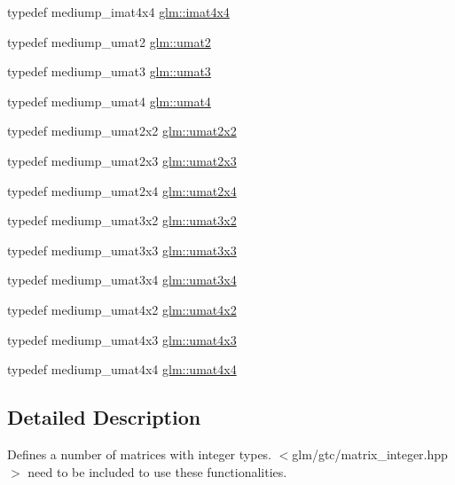 \begin{CompactItemize}
\item 
typedef mediump\_\-imat4x4 \hyperlink{group__gtc__matrix__integer_g367d8d5281ff82f1215a227dd2ea5ba9}{glm::imat4x4}
\item 
typedef mediump\_\-umat2 \hyperlink{group__gtc__matrix__integer_ge2d45c058cfa0b60ab4df0cdda2d8516}{glm::umat2}
\item 
typedef mediump\_\-umat3 \hyperlink{group__gtc__matrix__integer_g8b8fbc858e28abf8fc344744f8d6d368}{glm::umat3}
\item 
typedef mediump\_\-umat4 \hyperlink{group__gtc__matrix__integer_g7ae562000d8a8d193e9f93cf51e2e113}{glm::umat4}
\item 
typedef mediump\_\-umat2x2 \hyperlink{group__gtc__matrix__integer_gd3c997b31dd69bdb4787867e758ed48d}{glm::umat2x2}
\item 
typedef mediump\_\-umat2x3 \hyperlink{group__gtc__matrix__integer_g890ae28f9230794138b2c89f44ce3376}{glm::umat2x3}
\item 
typedef mediump\_\-umat2x4 \hyperlink{group__gtc__matrix__integer_g3b23b164240cf4dfb429776da7be9d88}{glm::umat2x4}
\item 
typedef mediump\_\-umat3x2 \hyperlink{group__gtc__matrix__integer_g257300f2710612877ef45438a366e308}{glm::umat3x2}
\item 
typedef mediump\_\-umat3x3 \hyperlink{group__gtc__matrix__integer_gb80b6501ba1b2c40119a0f2d256f4c97}{glm::umat3x3}
\item 
typedef mediump\_\-umat3x4 \hyperlink{group__gtc__matrix__integer_g5410857d098a989a30b4017100bc2ff7}{glm::umat3x4}
\item 
typedef mediump\_\-umat4x2 \hyperlink{group__gtc__matrix__integer_g13e8392218e9b6e1b7f194a21b5c88bf}{glm::umat4x2}
\item 
typedef mediump\_\-umat4x3 \hyperlink{group__gtc__matrix__integer_g08373f5588a54da1a48e5e55c7d51004}{glm::umat4x3}
\item 
typedef mediump\_\-umat4x4 \hyperlink{group__gtc__matrix__integer_ge0931b79e808fb0983848778a60eb548}{glm::umat4x4}
\end{CompactItemize}


\subsection{Detailed Description}
Defines a number of matrices with integer types. $<$glm/gtc/matrix\_\-integer.hpp$>$ need to be included to use these functionalities. 

